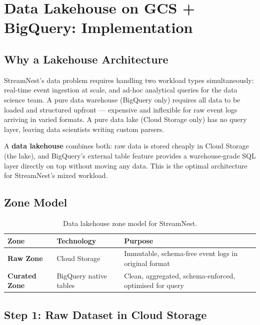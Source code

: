 \documentclass[12pt, a4paper]{article}
\begin{document}
\newpage
\section{Data Lakehouse on GCS + BigQuery: \mbox{Implementation}}

\subsection{Why a Lakehouse Architecture}

StreamNest's data problem requires handling two workload types simultaneously: real-time event ingestion at scale, and ad-hoc analytical queries for the data science team. A pure data warehouse (BigQuery only) requires all data to be loaded and structured upfront — expensive and inflexible for raw event logs arriving in varied formats. A pure data lake (Cloud Storage only) has no query layer, leaving data scientists writing custom parsers.

A \textbf{data lakehouse} combines both: raw data is stored cheaply in Cloud Storage (the lake), and BigQuery's external table feature provides a warehouse-grade SQL layer directly on top without moving any data. This is the optimal architecture for StreamNest's mixed workload.

\subsection{Zone Model}

\begin{table}[htbp]
\centering
\renewcommand{\arraystretch}{1.4}
\begin{tabularx}{\linewidth}{>{\bfseries}l l X}
\toprule
Zone & Technology & Purpose \\
\midrule
Raw Zone & Cloud Storage & Immutable, schema-free event logs in original format \\
Curated Zone & BigQuery native tables & Clean, aggregated, schema-enforced, optimised for query \\
\bottomrule
\end{tabularx}
\caption{Data lakehouse zone model for StreamNest.}
\end{table}

\subsection{Step 1: Raw Dataset in Cloud Storage}
\end{document}
